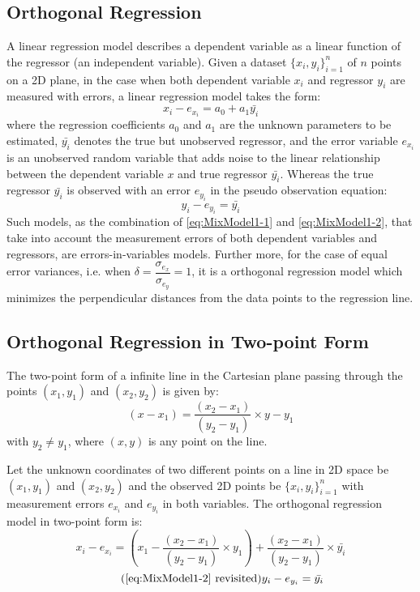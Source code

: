 \subsection{Orthogonal Regression}
\label{subsec:OrthogonalRegression}
A linear regression model describes a dependent variable as a linear function of the regressor (an independent variable). Given a dataset $\{x_i,y_i\}^n_{i=1}$ of $n$ points on a 2D plane, in the case when both dependent variable $x_i$ and regressor $y_i$ are measured with errors, a linear regression model takes the form:
\begin{equation} \label{eq:MixModel1-1}
x_i - e_{x_i} = %
a_0 + a_1\bar{y_i}
\end{equation}
where the regression coefficients $a_0$ and $a_1$ are the unknown parameters to be estimated, $\bar{y_i}$ denotes the true but unobserved regressor, and the error variable $e_{x_i}$ is an unobserved random variable that adds noise to the linear relationship between the dependent variable $x$ and true regressor $\bar{y_i}$. Whereas the true regressor $\bar{y_i}$ is observed with an error $e_{y_i}$ in the pseudo observation equation:
\begin{equation} \label{eq:MixModel1-2}
y_i-e_{y_i} = \bar{y_i}
\end{equation}
Such models, as the combination of \eqref{eq:MixModel1-1} and \eqref{eq:MixModel1-2}, that take into account the measurement errors of both dependent variables and regressors, are errors-in-variables models. Further more, for the case of equal error variances, i.e. when $\delta=\dfrac{\sigma_{e_x}}{\sigma_{e_y}}=1$, it is a orthogonal regression model which minimizes the perpendicular distances from the data points to the regression line.

\subsection{Orthogonal Regression in Two-point Form}
\label{subsec:NonLinear}

The two-point form of a infinite line in the Cartesian plane passing through the points $(x_1,y_1)$ and $(x_2,y_2)$ is given by:
\begin{equation} \label{eq:LineInTwoPointForm}
(x-x_1) = \dfrac{(x_2-x_1)}{(y_2-y_1)}\times y-y_1
\end{equation}
with $y_2\neq y_1$, where $(x,y)$ is any point on the line.

Let the unknown coordinates of two different points on a line in 2D space be $(x_1,y_1)$ and $(x_2,y_2)$ and the observed 2D points be $\{x_i,y_i\}^n_{i=1}$ with measurement errors $e_{x_i}$ and $e_{y_i}$ in both variables. The orthogonal regression model in two-point form is: 
\begin{equation} \label{eq:MixModel2-1}
x_i - e_{x_i}= (x_1-\dfrac{(x_2-x_1)}{(y_2-y_1)}\times y_1) + \dfrac{(x_2-x_1)}{(y_2-y_1)}\times \bar{y_i}
\end{equation}
\begin{equation} \tag{\ref{eq:MixModel1-2} revisited}
y_i-e_{y_i} = \bar{y_i}
\end{equation}

